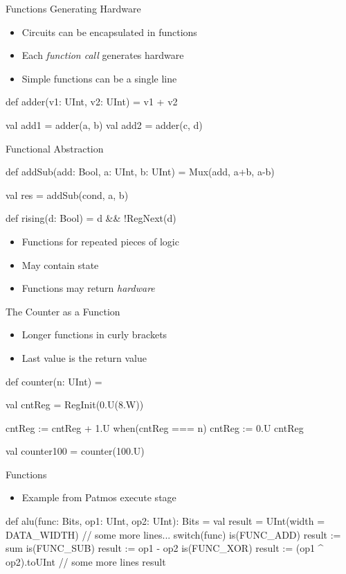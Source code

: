 \begin{frame}[fragile]{Functions Generating Hardware}
\begin{itemize}
\item Circuits can be encapsulated in functions
\item Each \emph{function call} generates hardware
\item Simple functions can be a single line
\end{itemize}
\begin{chisel}
  def adder(v1: UInt, v2: UInt) = v1 + v2
  
  val add1 = adder(a, b)
  val add2 = adder(c, d)
\end{chisel}
\end{frame}



\begin{frame}[fragile]{Functional Abstraction}
\begin{chisel}
  def addSub(add: Bool, a: UInt, b: UInt) =
    Mux(add, a+b, a-b)

  val res = addSub(cond, a, b)
  
  def rising(d: Bool) = d && !RegNext(d)
\end{chisel}
\begin{itemize}
\item Functions for repeated pieces of logic
\item May contain state
\item Functions may return \emph{hardware}
\end{itemize}
\end{frame}

\begin{frame}[fragile]{The Counter as a Function}
\begin{itemize}
\item Longer functions in curly brackets
\item Last value is the return value
\end{itemize}
\begin{chisel}
def counter(n: UInt) = {
  
  val cntReg = RegInit(0.U(8.W))
  
  cntReg := cntReg + 1.U
  when(cntReg === n) {
    cntReg := 0.U
  }
  cntReg
}

val counter100 = counter(100.U)
\end{chisel}
\end{frame}


\begin{frame}[fragile]{Functions}
\begin{itemize}
\item Example from Patmos execute stage
\end{itemize}
\begin{chisel}
def alu(func: Bits, op1: UInt, op2: UInt): Bits = {
  val result = UInt(width = DATA_WIDTH)
  // some more lines...
  switch(func) {
    is(FUNC_ADD) { result := sum }
    is(FUNC_SUB) { result := op1 - op2 }
    is(FUNC_XOR) { result := (op1 ^ op2).toUInt }
    // some more lines
  }
  result
}
\end{chisel}
\end{frame}




